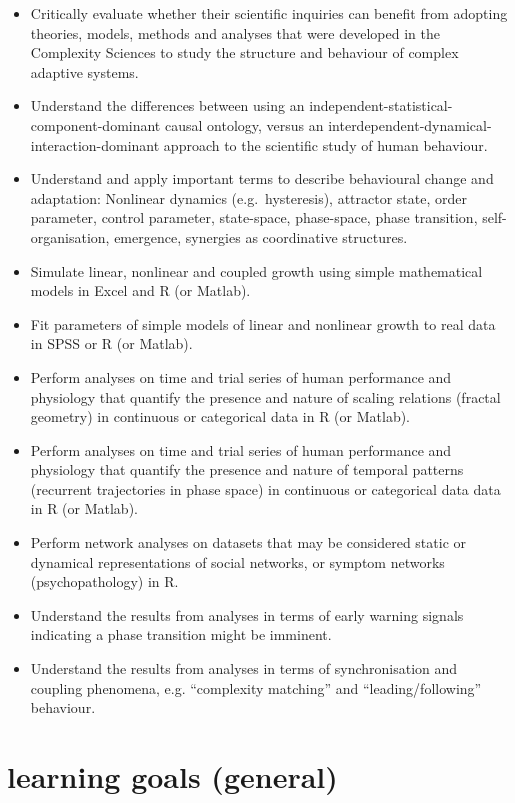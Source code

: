 \documentclass[12pt,]{book}
\providecommand{\tightlist}{%
  \setlength{\itemsep}{0pt}\setlength{\parskip}{0pt}}
\let\stdsection\section
\renewcommand\section{\newpage\stdsection}
\theoremstyle{definition}
\theoremstyle{definition}
\theoremstyle{definition}
\theoremstyle{remark}
\begin{document}
\begin{itemize}
\tightlist
\item
  Critically evaluate whether their scientific inquiries can benefit
  from adopting theories, models, methods and analyses that were
  developed in the Complexity Sciences to study the structure and
  behaviour of complex adaptive systems.
\item
  Understand the differences between using an
  independent-statistical-component-dominant causal ontology, versus an
  interdependent-dynamical-interaction-dominant approach to the
  scientific study of human behaviour.
\item
  Understand and apply important terms to describe behavioural change
  and adaptation: Nonlinear dynamics (e.g.~hysteresis), attractor state,
  order parameter, control parameter, state-space, phase-space, phase
  transition, self-organisation, emergence, synergies as coordinative
  structures.
\item
  Simulate linear, nonlinear and coupled growth using simple
  mathematical models in Excel and R (or Matlab).
\item
  Fit parameters of simple models of linear and nonlinear growth to real
  data in SPSS or R (or Matlab).
\item
  Perform analyses on time and trial series of human performance and
  physiology that quantify the presence and nature of scaling relations
  (fractal geometry) in continuous or categorical data in R (or Matlab).
\item
  Perform analyses on time and trial series of human performance and
  physiology that quantify the presence and nature of temporal patterns
  (recurrent trajectories in phase space) in continuous or categorical
  data data in R (or Matlab).
\item
  Perform network analyses on datasets that may be considered static or
  dynamical representations of social networks, or symptom networks
  (psychopathology) in R.
\item
  Understand the results from analyses in terms of early warning signals
  indicating a phase transition might be imminent.
\item
  Understand the results from analyses in terms of synchronisation and
  coupling phenomena, e.g. ``complexity matching'' and
  ``leading/following'' behaviour.
\end{itemize}

\section*{learning goals (general)}\label{learning-goals-general}
\end{document}
